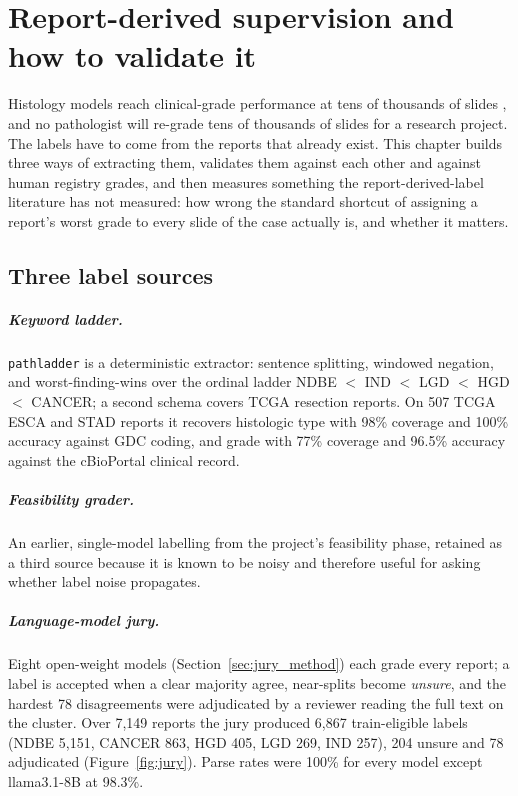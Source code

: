 \chapter{Report-derived supervision and how to validate it}
\label{ch:labels}

Histology models reach clinical-grade performance at tens of thousands of slides \citep{campanella2019}, and no pathologist will re-grade tens of thousands of slides for a research project. The labels have to come from the reports that already exist. This chapter builds three ways of extracting them, validates them against each other and against human registry grades, and then measures something the report-derived-label literature has not measured: how wrong the standard shortcut of assigning a report's worst grade to every slide of the case actually is, and whether it matters.

\section{Three label sources}

\paragraph{Keyword ladder.} \texttt{pathladder} is a deterministic extractor: sentence splitting, windowed negation, and worst-finding-wins over the ordinal ladder NDBE $<$ IND $<$ LGD $<$ HGD $<$ CANCER; a second schema covers TCGA resection reports. On 507 TCGA ESCA and STAD reports it recovers histologic type with 98\% coverage and 100\% accuracy against GDC coding, and grade with 77\% coverage and 96.5\% accuracy against the cBioPortal clinical record.

\paragraph{Feasibility grader.} An earlier, single-model labelling from the project's feasibility phase, retained as a third source because it is known to be noisy and therefore useful for asking whether label noise propagates.

\paragraph{Language-model jury.} Eight open-weight models (Section~\ref{sec:jury_method}) each grade every report; a label is accepted when a clear majority agree, near-splits become \emph{unsure}, and the hardest 78 disagreements were adjudicated by a reviewer reading the full text on the cluster. Over 7,149 reports the jury produced 6,867 train-eligible labels (NDBE 5,151, CANCER 863, HGD 405, LGD 269, IND 257), 204 unsure and 78 adjudicated (Figure~\ref{fig:jury}). Parse rates were 100\% for every model except llama3.1-8B at 98.3\%.

